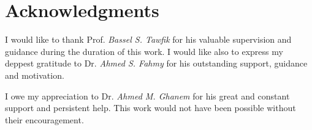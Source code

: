 
%



\bigskip

\begingroup
\let\clearpage\relax
\let\cleardoublepage\relax
\let\cleardoublepage\relax
\chapter*{Acknowledgments}
I would like to thank Prof. \textit{Bassel S. Tawfik} for his valuable supervision and guidance during the duration of this work. I would like also to express my deppest gratitude to Dr. \textit{Ahmed S. Fahmy} for his outstanding support, guidance and motivation. 

I owe my appreciation to Dr. \textit{Ahmed M. Ghanem} for his great and constant support and persistent help. This work would not have been possible without their encouragement.



\endgroup



